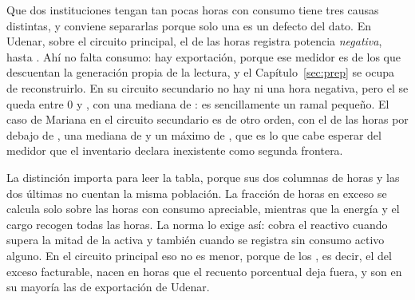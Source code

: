 
Que dos instituciones tengan tan pocas horas con consumo tiene tres causas
distintas, y conviene separarlas porque solo una es un defecto del dato. En
Udenar, sobre el circuito principal, el  de las horas registra
potencia \emph{negativa}, hasta . Ahí no falta consumo: hay
exportación, porque ese medidor es de los que descuentan la generación
propia de la lectura, y el Capítulo~\ref{sec:prep} se ocupa de
reconstruirlo. En su circuito secundario no hay ni una hora negativa, pero
el  se queda entre 0 y , con una mediana de
: es sencillamente un ramal pequeño. El caso de Mariana en el
circuito secundario es de otro orden, con el  de las horas por
debajo de , una mediana de  y un máximo de
, que es lo que cabe esperar del medidor que el inventario
declara inexistente como segunda frontera.

La distinción importa para leer la tabla, porque sus dos columnas de horas
y las dos últimas no cuentan la misma población. La fracción de horas en
exceso se calcula solo sobre las horas con consumo apreciable, mientras que
la energía y el cargo recogen todas las horas. La norma lo exige así: cobra
el reactivo cuando supera la mitad de la activa y también cuando se
registra sin consumo activo alguno. En el circuito principal eso no es
menor, porque  de los , es decir, el
 del exceso facturable, nacen en horas que el recuento porcentual
deja fuera, y son en su mayoría las de exportación de Udenar.

